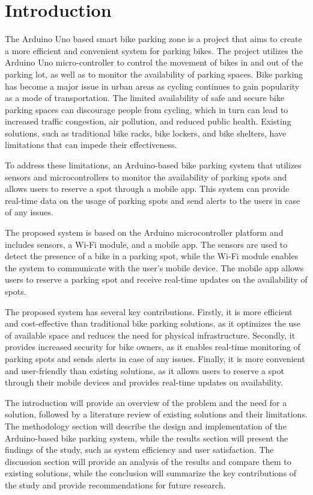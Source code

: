\documentclass[conference]{IEEEtran}
\begin{document}
	\section{Introduction}

	The Arduino Uno based smart bike parking zone is a project that aims to create a more efficient and convenient system for parking bikes. The project utilizes the Arduino Uno micro-controller to control the movement of bikes in and out of the parking lot, as well as to monitor the availability of parking spaces. 
	Bike parking has become a major issue in urban areas as cycling continues to gain popularity as a mode of transportation. The limited availability of safe and secure bike parking spaces can discourage people from cycling, which in turn can lead to increased traffic congestion, air pollution, and reduced public health. Existing solutions, such as traditional bike racks, bike lockers, and bike shelters, have limitations that can impede their effectiveness.\cite{b8}
	
	To address these limitations, an Arduino-based bike parking system that utilizes sensors and microcontrollers to monitor the availability of parking spots and allows users to reserve a spot through a mobile app. This system can provide real-time data on the usage of parking spots and send alerts to the users in case of any issues. 
	
	The proposed system is based on the Arduino microcontroller platform and includes sensors, a Wi-Fi module, and a mobile app. The sensors are used to detect the presence of a bike in a parking spot, while the Wi-Fi module enables the system to communicate with the user's mobile device. The mobile app allows users to reserve a parking spot and receive real-time updates on the availability of spots.
	
	
	The proposed system has several key contributions. Firstly, it is more efficient and cost-effective than traditional bike parking solutions, as it optimizes the use of available space and reduces the need for physical infrastructure. Secondly, it provides increased security for bike owners, as it enables real-time monitoring of parking spots and sends alerts in case of any issues. Finally, it is more convenient and user-friendly than existing solutions, as it allows users to reserve a spot through their mobile devices and provides real-time updates on availability.
	
	 The introduction will provide an overview of the problem and the need for a solution, followed by a literature review of existing solutions and their limitations. The methodology section will describe the design and implementation of the Arduino-based bike parking system, while the results section will present the findings of the study, such as system efficiency and user satisfaction. The discussion section will provide an analysis of the results and compare them to existing solutions, while the conclusion will summarize the key contributions of the study and provide recommendations for future research.\cite{b9}
\end{document}
